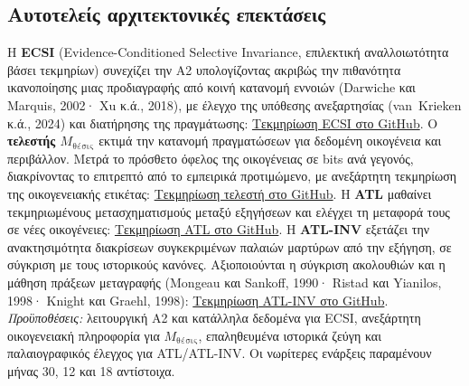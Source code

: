 \documentclass[a4paper]{article}
\newcommand{\Mth}{\ensuremath{M_{\text{θέσις}}}}
\begin{document}
\subsection{Αυτοτελείς αρχιτεκτονικές επεκτάσεις}\label{app:architectures}
Η \textbf{ECSI} (Evidence-Conditioned Selective Invariance, επιλεκτική αναλλοιωτότητα βάσει τεκμηρίων) συνεχίζει την Α2 υπολογίζοντας ακριβώς την πιθανότητα ικανοποίησης μιας προδιαγραφής από κοινή κατανομή εννοιών (Darwiche και Marquis, 2002· Xu κ.ά., 2018), με έλεγχο της υπόθεσης ανεξαρτησίας (van~Krieken κ.ά., 2024) και διατήρησης της πραγμάτωσης: \href{https://github.com/GeorgeSpy/byz-position-phd-study/blob/main/docs/research/ecsi/README.md}{Τεκμηρίωση ECSI στο GitHub}. Ο \textbf{τελεστής \Mth} εκτιμά την κατανομή πραγματώσεων για δεδομένη οικογένεια και περιβάλλον. Μετρά το πρόσθετο όφελος της οικογένειας σε bits ανά γεγονός, διακρίνοντας το επιτρεπτό από το εμπειρικά προτιμώμενο, με ανεξάρτητη τεκμηρίωση της οικογενειακής ετικέτας: \href{https://github.com/GeorgeSpy/byz-position-phd-study/blob/main/docs/current/m-thesis.md}{Τεκμηρίωση τελεστή στο GitHub}. Η \textbf{ATL} μαθαίνει τεκμηριωμένους μετασχηματισμούς μεταξύ εξηγήσεων και ελέγχει τη μεταφορά τους σε νέες οικογένειες: \href{https://github.com/GeorgeSpy/byz-position-phd-study/blob/main/docs/current/atl.md}{Τεκμηρίωση ATL στο GitHub}. Η \textbf{ATL-INV} εξετάζει την ανακτησιμότητα διακρίσεων συγκεκριμένων παλαιών μαρτύρων από την εξήγηση, σε σύγκριση με τους ιστορικούς κανόνες. Αξιοποιούνται η σύγκριση ακολουθιών και η μάθηση πράξεων μεταγραφής (Mongeau και Sankoff, 1990· Ristad και Yianilos, 1998· Knight και Graehl, 1998): \href{https://github.com/GeorgeSpy/byz-position-phd-study/blob/main/docs/current/inverse-problem.md}{Τεκμηρίωση ATL-INV στο GitHub}. \textit{Προϋποθέσεις:} λειτουργική Α2 και κατάλληλα δεδομένα για ECSI, ανεξάρτητη οικογενειακή πληροφορία για \Mth, επαληθευμένα ιστορικά ζεύγη και παλαιογραφικός έλεγχος για ATL/ATL-INV. Οι νωρίτερες ενάρξεις παραμένουν μήνας 30, 12 και 18 αντίστοιχα.
\end{document}
